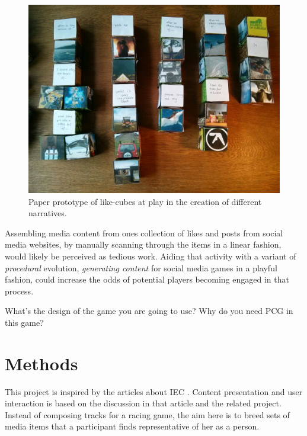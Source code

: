 \documentclass[]{article}
\begin{document}
\begin{figure}[h!]
	\centerline{\includegraphics[width=\columnwidth]{IMG_20141029_110139.jpg}}
	\caption{Paper prototype of like-cubes at play in the creation of different narratives.}
	\label{fig:narratives}
\end{figure}

Assembling media content from ones collection of likes and posts from social media websites, by manually scanning through the items in a linear fashion, would likely be perceived as tedious work.  Aiding that activity with a variant of \textit{procedural} evolution, \textit{generating content} for social media games in a playful fashion, could increase the odds of potential players becoming engaged in that process.


\begin{framed}
What’s the design of the game you are going to use? Why do you need PCG in this game?
\end{framed}

\section{Methods}
\label{sec:Methods}

This project is inspired by the articles about IEC \cite{cardamone2011interactive,secretan2011picbreeder,togelius2007towards}.  Content presentation and user interaction is based on the discussion in that article and the related project.  Instead of composing tracks for a racing game, the aim here is to breed sets of media items that a participant finds representative of her as a person.
\end{document}

